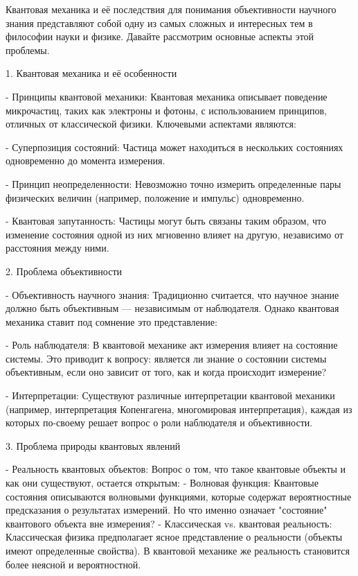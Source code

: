 \documentclass[exam_answers.tex]{subfiles}
\begin{document}
\renewcommand{\baselinestretch}{\blch}

Квантовая механика и её последствия для понимания объективности научного знания представляют собой одну из самых сложных и интересных тем в философии науки и физике.
Давайте рассмотрим основные аспекты этой проблемы.

1. Квантовая механика и её особенности

- Принципы квантовой механики: Квантовая механика описывает поведение микрочастиц, таких как электроны и фотоны, с использованием принципов, отличных от классической физики. Ключевыми аспектами являются:

  - Суперпозиция состояний: Частица может находиться в нескольких состояниях одновременно до момента измерения.
  
  - Принцип неопределенности: Невозможно точно измерить определенные пары физических величин (например, положение и импульс) одновременно.
  
  - Квантовая запутанность: Частицы могут быть связаны таким образом, что изменение состояния одной из них мгновенно влияет на другую, независимо от расстояния между ними.

2. Проблема объективности

- Объективность научного знания: Традиционно считается, что научное знание должно быть объективным — независимым от наблюдателя. Однако квантовая механика ставит под сомнение это представление:

  - Роль наблюдателя: В квантовой механике акт измерения влияет на состояние системы. Это приводит к вопросу: является ли знание о состоянии системы объективным, если оно зависит от того, как и когда происходит измерение?
  
  - Интерпретации: Существуют различные интерпретации квантовой механики (например, интерпретация Копенгагена, многомировая интерпретация), каждая из которых по-своему решает вопрос о роли наблюдателя и объективности.

3. Проблема природы квантовых явлений

- Реальность квантовых объектов: Вопрос о том, что такое квантовые объекты и как они существуют, остается открытым:
  - Волновая функция: Квантовые состояния описываются волновыми функциями, которые содержат вероятностные предсказания о результатах измерений. Но что именно означает "состояние" квантового объекта вне измерения?
  - Классическая vs. квантовая реальность: Классическая физика предполагает ясное представление о реальности (объекты имеют определенные свойства). В квантовой механике же реальность становится более неясной и вероятностной.
\end{document}
